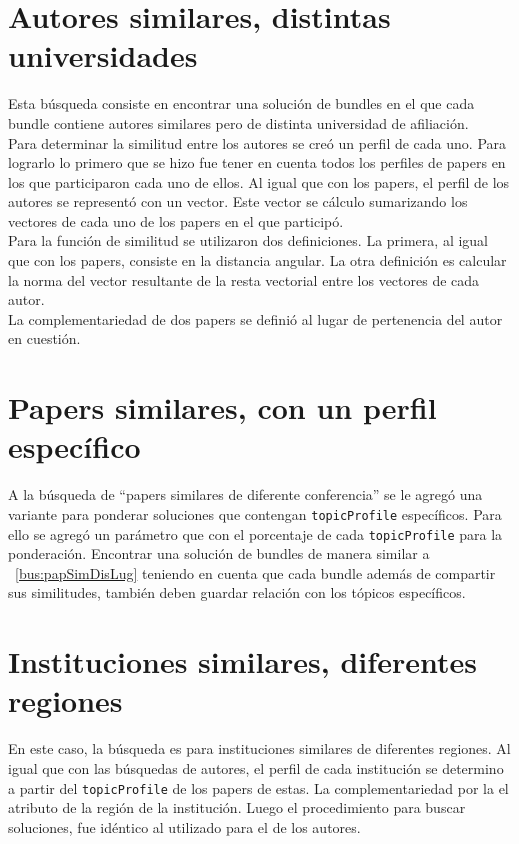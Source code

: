 \section{Autores similares, distintas universidades}
Esta búsqueda consiste en encontrar una solución de bundles en el que cada bundle contiene autores 
similares pero de distinta universidad de afiliación.\\
Para determinar la similitud entre los autores se creó un perfil de cada uno. Para lograrlo lo 
primero que se hizo fue tener en cuenta todos los perfiles de papers en los que participaron cada 
uno de ellos. Al igual que con los papers, el perfil de los autores se representó con un vector. 
Este vector se cálculo sumarizando los vectores de cada uno de los papers en el que participó.\\
Para la función de similitud se utilizaron dos definiciones. La primera, al igual que con los papers,
consiste en la distancia angular. La otra definición es calcular la norma del vector resultante de la resta
vectorial entre los vectores de cada autor.\\
La complementariedad de dos papers se definió al lugar de pertenencia del autor en cuestión.
\section{Papers similares, con un perfil específico}
A la búsqueda de ``papers similares de diferente conferencia'' se le agregó una variante para ponderar
soluciones que contengan \texttt{topicProfile} específicos.
Para ello se agregó un parámetro que con el porcentaje de cada \texttt{topicProfile} para la ponderación.
Encontrar una solución de bundles de manera similar a ~\ref{bus:papSimDisLug} teniendo en cuenta que cada 
bundle además de compartir sus similitudes, también deben guardar relación con los tópicos 
específicos.\\
\section{Instituciones similares, diferentes regiones}
En este caso, la búsqueda es para instituciones similares de diferentes regiones. Al igual que con las 
búsquedas de autores, el perfil de cada institución se determino a partir del \texttt{topicProfile} de los papers
de estas. La complementariedad por la el atributo de la región de la institución. 
Luego el procedimiento para buscar soluciones, fue idéntico al utilizado para el de los autores.